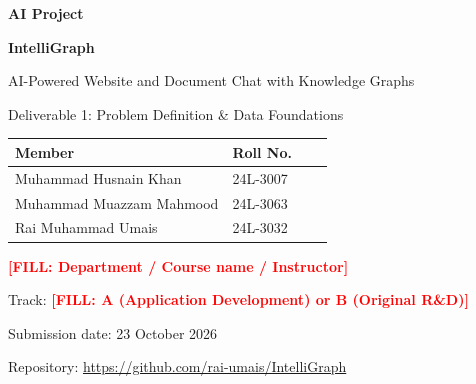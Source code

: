 \documentclass[11pt,a4paper]{article}
\newcommand{\todo}[1]{\textcolor{red}{\textbf{[FILL: #1]}}}
\begin{document}
\begin{titlepage}
\centering
\vspace*{2cm}
{\Large\bfseries AI Project\par}
\vspace{0.6cm}
{\Huge\bfseries IntelliGraph\par}
\vspace{0.3cm}
{\Large AI-Powered Website and Document Chat with Knowledge Graphs\par}
\vspace{1.2cm}
{\LARGE Deliverable 1: Problem Definition \& Data Foundations\par}
\vspace{1.5cm}
\begin{tabular}{llll}
\toprule
\textbf{Member} & \textbf{Roll No.} \\
\midrule
Muhammad Husnain Khan & 24L-3007 \\
Muhammad Muazzam Mahmood & 24L-3063 \\
Rai Muhammad Umais & 24L-3032 \\
\bottomrule
\end{tabular}
\vspace{1cm}

\todo{Department / Course name / Instructor}\par
\vspace{0.5cm}
Track: \todo{A (Application Development) or B (Original R\&D)}\par
\vspace{0.5cm}
Submission date: 23 October 2026\par
\vspace{0.5cm}
Repository: \url{https://github.com/rai-umais/IntelliGraph}
\vfill
\end{titlepage}

\begin{abstract}
IntelliGraph is an application that lets users extract and chat with information from any website or uploaded document. It combines automated web scraping to obtain clean text, a knowledge graph that maps how concepts in the source relate to each other, and a conversational AI that answers questions strictly from the collected data, with citations. This report covers Phase~1 (problem definition) and Phase~2 (data acquisition and preprocessing). It documents the real-world pain point, the target audience, the technical justification for using machine learning, and the data pipeline: collection, cleaning, feature strategy and exploratory data analysis. \todo{Add 2--3 sentences with your actual results: number of sources collected, documents kept after cleaning, languages found.}
\end{abstract}
\end{document}
